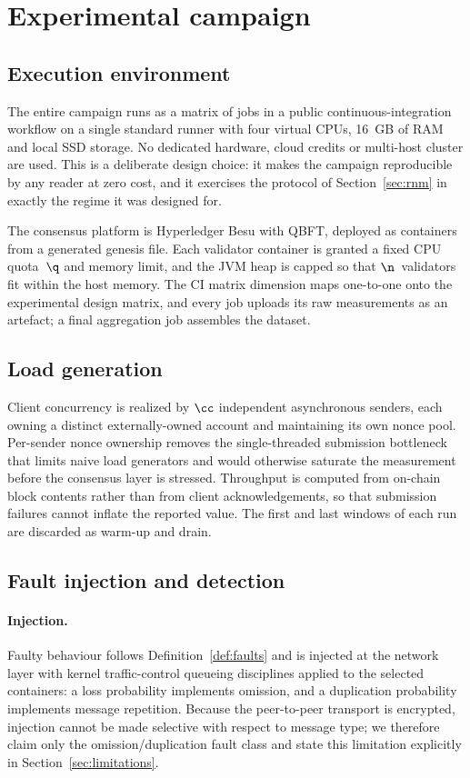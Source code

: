 \section{Experimental campaign}
\label{sec:experiments}

\subsection{Execution environment}

The entire campaign runs as a matrix of jobs in a public continuous-integration
workflow on a single standard runner with four virtual CPUs, 16~GB of RAM and
local SSD storage. No dedicated hardware, cloud credits or multi-host cluster
are used. This is a deliberate design choice: it makes the campaign
reproducible by any reader at zero cost, and it exercises the \RNM{} protocol of
Section~\ref{sec:rnm} in exactly the regime it was designed for.

The consensus platform is Hyperledger Besu with QBFT, deployed as containers
from a generated genesis file. Each validator container is granted a fixed CPU
quota~$\q$ and memory limit, and the JVM heap is capped so that
$\n$~validators fit within the host memory. The CI matrix dimension maps
one-to-one onto the experimental design matrix, and every job uploads its raw
measurements as an artefact; a final aggregation job assembles the dataset.

\subsection{Load generation}

Client concurrency is realized by $\cc$ independent asynchronous senders, each
owning a distinct externally-owned account and maintaining its own nonce pool.
Per-sender nonce ownership removes the single-threaded submission bottleneck
that limits naive load generators and would otherwise saturate the measurement
before the consensus layer is stressed. Throughput is computed from on-chain
block contents rather than from client acknowledgements, so that submission
failures cannot inflate the reported value. The first and last windows of each
run are discarded as warm-up and drain.

\subsection{Fault injection and detection}

\paragraph{Injection.}
Faulty behaviour follows Definition~\ref{def:faults} and is injected at the
network layer with kernel traffic-control queueing disciplines applied to the
selected containers: a loss probability implements omission, and a duplication
probability implements message repetition. Because the peer-to-peer transport is
encrypted, injection cannot be made selective with respect to message type; we
therefore claim only the omission/duplication fault class and state this
limitation explicitly in Section~\ref{sec:limitations}.

